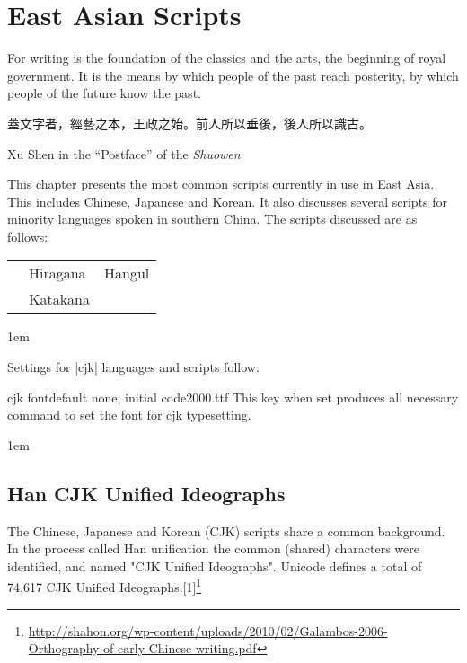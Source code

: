 \makeatletter\@specialfalse\@debugfalse\makeatother


\pagestyle{headings}
\chapter{East Asian Scripts}
\epigraph{

For writing is the foundation of the classics and the arts, the beginning of
royal government. It is the means by which people of the past reach posterity,
by which people of the future know the past. 

{\cjk 蓋文字者，經藝之本，王政之始。前人所以垂後，後人所以識古。}
}{ Xu Shen  in the ``Postface'' of the \emph{Shuowen}}

\bigskip

\noindent This chapter presents the most common scripts currently in use in East Asia. This includes Chinese, Japanese and Korean. It also discusses several scripts for minority languages spoken in southern China. The scripts discussed are as follows:


\begin{center}
\begin{tabular}{lll}
\nameref{s:han} &Hiragana &Hangul\\
\nameref{s:bopomofo} &Katakana &\nameref{s:yi}\\
\end{tabular}
\end{center}
\bigskip

\parindent1em

Settings for |cjk| languages and scripts follow:

\begin{docKey}[phd]{cjk font}{}{default none, initial code2000.ttf}
This key when set produces all necessary command to set the font for cjk typesetting.
\end{docKey}

\parindent1em
\section{Han CJK Unified Ideographs}
\label{s:han}
The Chinese, Japanese and Korean (CJK) scripts share a common background. In the process called Han unification the common (shared) characters were identified, and named "CJK Unified Ideographs". Unicode defines a total of 74,617 CJK Unified Ideographs.[1]\footnote{\protect\url{http://shahon.org/wp-content/uploads/2010/02/Galambos-2006-Orthography-of-early-Chinese-writing.pdf}}

